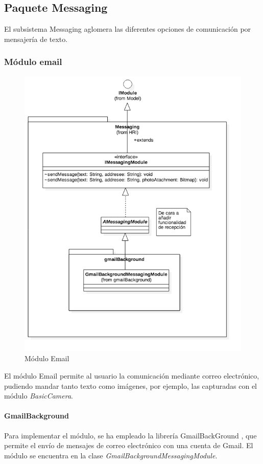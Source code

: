 \subsection{Paquete Messaging}
El subsistema Messaging aglomera las diferentes opciones de comunicación por mensajería de texto.
\subsubsection{Módulo email}
\begin{figure}
	\centering
	\includegraphics[width=0.7\linewidth]{imagenes/diagramas/MessagingModule.png}
	\caption{Módulo Email}
	\label{fig:email-module}
\end{figure}
El módulo Email permite al usuario la comunicación mediante correo electrónico, pudiendo mandar tanto texto como imágenes, por ejemplo, las capturadas con el módulo \textit{BasicCamera}.

\paragraph*{GmailBackground\\}
Para implementar el módulo, se ha empleado la librería GmailBackGround \cite{gmailbg}, que permite el envío de mensajes de correo electrónico con una cuenta de Gmail. El módulo se encuentra en la clase \textit{GmailBackgroundMessagingModule}.
\newpage








